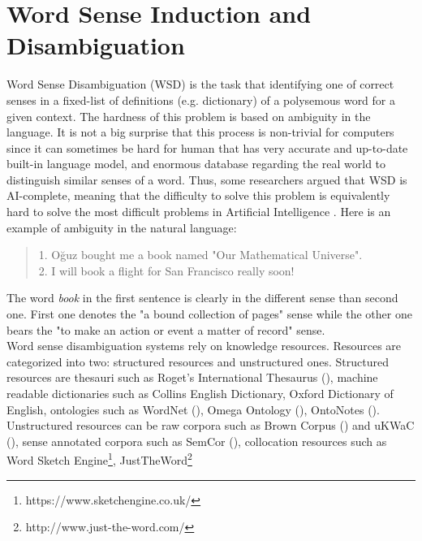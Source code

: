 \section{Word Sense Induction and Disambiguation}

Word Sense Disambiguation (WSD) is the task that identifying one of correct senses in a fixed-list of definitions (e.g. dictionary) of a polysemous word for a given context. The hardness of this problem is based on ambiguity in the language. It is not a big surprise that this process is non-trivial for computers since it can sometimes be hard for human that has very accurate and up-to-date built-in language model, and enormous database regarding the real world to distinguish similar senses of a word. Thus, some researchers argued that WSD is AI-complete, meaning that the difficulty to solve this problem is equivalently hard to solve the most difficult problems in Artificial Intelligence \cite{mallery1988thinking}. Here is an example of ambiguity in the natural language: \\

\begin{quote}
1. Oğuz bought me a book named "Our Mathematical Universe".\\ 2. I will book a flight for San Francisco really soon!
\end{quote}


The word \emph{book} in the first sentence is clearly in the different sense than second one. First one denotes the "a bound collection of pages" sense while the other one bears the "to make an action or event a matter of record" sense. \\

Word sense disambiguation systems rely on knowledge resources. Resources are categorized into two: structured resources and unstructured ones. Structured resources are thesauri such as Roget's International Thesaurus (\cite{chapman1984roget}), machine readable dictionaries such as Collins English Dictionary, Oxford Dictionary of English, ontologies such as WordNet (\cite{fellbaum98electronic}), Omega Ontology (\cite{philpot2005omega}), OntoNotes (\cite{hovy06ontonotes}). Unstructured resources can be raw corpora such as Brown Corpus (\cite{francis1979brown}) and uKWaC (\cite{ukWaC}), sense annotated corpora such as SemCor (\cite{mihalcea1998semcor}), collocation resources such as Word Sketch Engine\footnote{https://www.sketchengine.co.uk/}, JustTheWord\footnote{http://www.just-the-word.com/}





